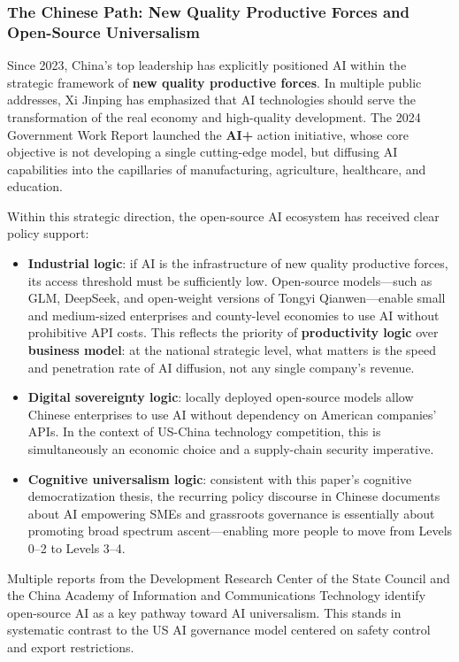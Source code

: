 ﻿\documentclass[12pt,a4paper]{article}
\begin{document}
\subsubsection{The Chinese Path: New Quality Productive Forces and Open-Source Universalism}

Since 2023, China's top leadership has explicitly positioned AI within the strategic framework of \textbf{new quality productive forces}. In multiple public addresses, Xi Jinping has emphasized that AI technologies should serve the transformation of the real economy and high-quality development. The 2024 Government Work Report launched the \textbf{AI+} action initiative, whose core objective is not developing a single cutting-edge model, but diffusing AI capabilities into the capillaries of manufacturing, agriculture, healthcare, and education.

Within this strategic direction, the open-source AI ecosystem has received clear policy support:

\begin{itemize}
\item \textbf{Industrial logic}: if AI is the infrastructure of new quality productive forces, its access threshold must be sufficiently low. Open-source models---such as GLM, DeepSeek, and open-weight versions of Tongyi Qianwen---enable small and medium-sized enterprises and county-level economies to use AI without prohibitive API costs. This reflects the priority of \textbf{productivity logic} over \textbf{business model}: at the national strategic level, what matters is the speed and penetration rate of AI diffusion, not any single company's revenue.
\item \textbf{Digital sovereignty logic}: locally deployed open-source models allow Chinese enterprises to use AI without dependency on American companies' APIs. In the context of US-China technology competition, this is simultaneously an economic choice and a supply-chain security imperative.
\item \textbf{Cognitive universalism logic}: consistent with this paper's cognitive democratization thesis, the recurring policy discourse in Chinese documents about AI empowering SMEs and grassroots governance is essentially about promoting broad spectrum ascent---enabling more people to move from Levels 0--2 to Levels 3--4.
\end{itemize}

Multiple reports from the Development Research Center of the State Council and the China Academy of Information and Communications Technology identify open-source AI as a key pathway toward AI universalism. This stands in systematic contrast to the US AI governance model centered on safety control and export restrictions.
\end{document}
